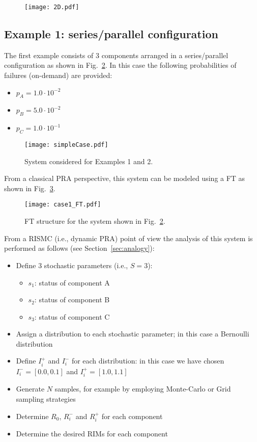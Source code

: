\begin{figure}
    \centering
    \texttt{[image: 2D.pdf]}
    \caption{}
    \label{fig:2Danalogy}
\end{figure} 

\subsection{Example 1: series/parallel configuration}
\label{sec:example1}

The first example consists of 3 components 
arranged in a series/parallel configuration as shown in Fig.~\ref{fig:example12}. 
In this case the following probabilities of failures (on-demand) are provided:
\begin{itemize}
  \item $p_A = 1.0 \cdot 10^{-2}$
  \item $p_B = 5.0 \cdot 10^{-2}$
  \item $p_C = 1.0 \cdot 10^{-1}$
\end{itemize}

\begin{figure}
    \centering
    \centerline{\texttt{[image: simpleCase.pdf]}}
    \caption{System considered for Examples 1 and 2.}
    \label{fig:example12}
\end{figure}

From a classical PRA perspective, this system can be modeled using a FT as shown in Fig.~\ref{fig:case1_FT}.

\begin{figure}
    \centering
    \centerline{\texttt{[image: case1\_FT.pdf]}}
    \caption{FT structure for the system shown in Fig.~\ref{fig:example12}.}
    \label{fig:case1_FT}
\end{figure}
  
From a RISMC (i.e., dynamic PRA) point of view the analysis of this system is performed as 
follows (see Section~\ref{sec:analogy}):
\begin{itemize}
  \item Define 3 stochastic parameters (i.e., $S=3$):
    \begin{itemize}
      \item $s_1$: status of component A
      \item $s_2$: status of component B
      \item $s_3$: status of component C
    \end{itemize}
  \item Assign a distribution to each stochastic parameter; in this case a Bernoulli 
        distribution  
  \item Define $I_i^+$ and $I_i^-$ for each distribution: in this case we have chosen 
        $I_i^-=[0.0,0.1]$ and $I_i^+=[1.0,1.1]$ 
  \item Generate $N$ samples, for example by employing Monte-Carlo or Grid sampling strategies
  \item Determine $R_0$, $R_i^-$ and $R_i^+$ for each component 
  \item Determine the desired RIMs for each component
\end{itemize}

